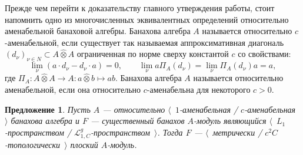 \documentclass[12pt]{article}
\newtheorem{proposition}[theorem]{Предложение}
\newcommand{\projtens}{\mathbin{\widehat{\otimes}}}
\begin{document}
Прежде чем перейти к доказательству главного утверждения работы, стоит напомнить
одно из многочисленных эквивалентных определений относительно аменабельной
банаховой алгебры. Банахова алгебра $A$ называется относительно
$c$-аменабельной, если существует так называемая аппроксимативная диагональ
${(d_\nu)}_{\nu\in N}\subset A\projtens A$ ограниченная по норме сверху
константой $c$ со свойствами:
\[
\lim_\nu(a\cdot d_\nu-d_\nu\cdot a)=0,\qquad 
\lim_\nu a \Pi_A(d_\nu)=\lim_\nu\Pi_A(d_\nu)a=a,
\]
где $\Pi_A:A\projtens A\to A:a\projtens b\mapsto ab$. Банахова алгебра $A$
называется относительно аменабельной, если она относительно $c$-аменабельна для
некоторого $c>0$.

\begin{proposition}\label{MetTopEssL1FlatModAoverAmenBanAlg} Пусть $A$ ---
относительно $\langle$~$1$-аменабельная / $c$-аменабельная~$\rangle$ банахова
алгебра и $F$ --- существенный банахов $A$-модуль являющийся
$\langle$~$L_1$-пространством / $\mathcal{L}_{1,C}^g$-пространством~$\rangle$.
Тогда $F$ --- $\langle$~метрически / $c^2C$-топологически~$\rangle$ плоский
$A$-модуль.
\end{proposition}
\end{document}
